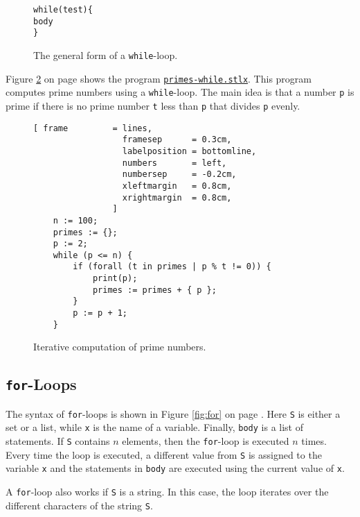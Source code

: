 \begin{figure}[!ht]
  \centering
\begin{alltt}
      while (test) \{
          body
      \}
\end{alltt}
\vspace*{-0.3cm}
\caption{The general form of a \texttt{while}-loop.  \label{fig:while}}
\end{figure} 

Figure \ref{fig:primes-while.stlx} on page \pageref{fig:primes-while.stlx} shows the program
\href{https://github.com/karlstroetmann/Logik/blob/master/SetlX/primes-while.stlx}{\texttt{primes-while.stlx}}.
This program computes prime numbers using a  \texttt{while}-loop.  The main idea is that a number \texttt{p} is
prime if there is no prime number \texttt{t} less than \texttt{p} that divides \texttt{p} evenly.


\begin{figure}[!ht]
  \centering
\begin{Verbatim}[ frame         = lines, 
                  framesep      = 0.3cm, 
                  labelposition = bottomline,
                  numbers       = left,
                  numbersep     = -0.2cm,
                  xleftmargin   = 0.8cm,
                  xrightmargin  = 0.8cm,
                ]
    n := 100;
    primes := {};
    p := 2;
    while (p <= n) {
        if (forall (t in primes | p % t != 0)) {
            print(p);
            primes := primes + { p };
        }
        p := p + 1;
    }
\end{Verbatim} 
\vspace*{-0.3cm}
\caption{Iterative computation of prime numbers.}  \label{fig:primes-while.stlx}
\end{figure} %


\subsection{\texttt{for}-Loops}
The syntax of  \texttt{for}-loops is shown in Figure \ref{fig:for} on page \pageref{fig:for}.  
Here \texttt{S} is either a set or a list, while \texttt{x} is the name of a variable.  Finally, \texttt{body}
is a list of statements.
If \texttt{S} contains $n$ elements, then the \texttt{for}-loop is executed $n$ times.  Every time the loop is
executed, a different value from \texttt{S} is assigned to the variable \texttt{x} and the statements in
\texttt{body} are executed using the current value of \texttt{x}.

A \texttt{for}-loop also works if \texttt{S} is a string.  In this case, the loop iterates over the different characters
of the string \texttt{S}.

